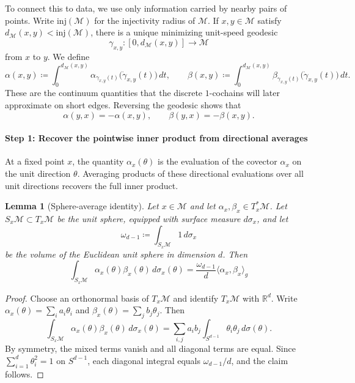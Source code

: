 \documentclass[a4paper,11pt, DIV=10]{scrartcl}
\numberwithin{equation}{section}
\newtheorem{lemma}[theorem]{Lemma}
\theoremstyle{definition}
\theoremstyle{remark}
\newcommand{\R}{\mathbb{R}}
\newcommand{\mc}[1]{\mathcal{#1}}
\begin{document}
To connect this to data, we use only information carried by nearby pairs of points. Write $\mathrm{inj}(\mc{M})$ for the injectivity radius of $\mc{M}$. If $x,y\in \mc{M}$ satisfy $d_{\mc{M}}(x,y)<\mathrm{inj}(\mc{M})$, there is a unique minimizing unit-speed geodesic
\begin{equation}
\gamma_{x,y}\colon [0,d_{\mc{M}}(x,y)]\to \mc{M}
\end{equation}
from $x$ to $y$. We define
\begin{equation}
\alpha(x,y)\coloneq \int_0^{d_{\mc{M}}(x,y)} \alpha_{\gamma_{x,y}(t)}\!\bigl(\dot{\gamma}_{x,y}(t)\bigr)\,dt,
\qquad
\beta(x,y)\coloneq \int_0^{d_{\mc{M}}(x,y)} \beta_{\gamma_{x,y}(t)}\!\bigl(\dot{\gamma}_{x,y}(t)\bigr)\,dt.
\end{equation}
These are the continuum quantities that the discrete $1$-cochains will later approximate on short edges. Reversing the geodesic shows that
\begin{equation}
\alpha(y,x)=-\alpha(x,y),
\qquad
\beta(y,x)=-\beta(x,y).
\end{equation}

\paragraph{Step 1: Recover the pointwise inner product from directional averages}
At a fixed point $x$, the quantity $\alpha_x(\theta)$ is the evaluation of the covector $\alpha_x$ on the unit direction $\theta$. Averaging products of these directional evaluations over all unit directions recovers the full inner product.

\begin{lemma}[Sphere-average identity]
Let $x\in \mc{M}$ and let $\alpha_x,\beta_x\in T_x^*\mc{M}$.
Let $S_x\mc{M}\subset T_x\mc{M}$ be the unit sphere, equipped with surface measure $d\sigma_x$, and let
\begin{equation}
\omega_{d-1}\coloneq \int_{S_x\mc{M}} 1\,d\sigma_x
\end{equation}
be the volume of the Euclidean unit sphere in dimension $d$. Then
\begin{equation}
\int_{S_x\mc{M}} \alpha_x(\theta)\beta_x(\theta)\,d\sigma_x(\theta)
=
\frac{\omega_{d-1}}{d}\langle \alpha_x,\beta_x\rangle_g
\end{equation}
\end{lemma}
\begin{proof}
Choose an orthonormal basis of $T_x\mc{M}$ and identify $T_x\mc{M}$ with $\R^d$.
Write $\alpha_x(\theta)=\sum_i a_i\theta_i$ and $\beta_x(\theta)=\sum_j b_j\theta_j$.
Then
\begin{equation}
\int_{S_x\mc{M}} \alpha_x(\theta)\beta_x(\theta)\,d\sigma_x(\theta)
=
\sum_{i,j} a_i b_j \int_{S^{d-1}} \theta_i\theta_j\,d\sigma(\theta).
\end{equation}
By symmetry, the mixed terms vanish and all diagonal terms are equal. Since $\sum_{i=1}^d \theta_i^2=1$ on $S^{d-1}$, each diagonal integral equals $\omega_{d-1}/d$, and the claim follows.
\end{proof}
\end{document}
